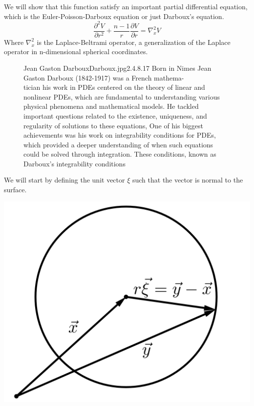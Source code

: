We will show that this function satisfy an important partial differential equation, which is the Euler-Poisson-Darboux equation or just Darboux's equation.
\begin{equation}
\frac{\partial^2 V}{\partial r^2} + \frac{n-1}{r}\frac{\partial V}{\partial r} = \nabla_{x}^{2} V
\end{equation} 
Where $\nabla_{x}^{2}$ is the Laplace-Beltrami operator, a generalization of the Laplace operator in n-dimensional spherical coordinates.
\par
\begin{figure}[b]
    \begin{minipage}[h]{\textwidth}
        \begin{enrichment}{Jean Gaston Darboux}{Darboux.jpg}{2.4}{.8}{.17}
            Born in Nimes Jean Gaston Darboux (1842-1917) was a French mathema-
            \\
            tician his work in PDEs centered on the theory of linear and nonlinear PDEs, 
            which are fundamental to understanding various physical phenomena and mathematical models. 
            He tackled important questions related to the existence, uniqueness, and regularity of solutions to these equations, 
            One of his biggest achievements was his work on integrability conditions for PDEs, which provided a deeper understanding of when such equations could be solved through integration. These conditions, known as Darboux's integrability conditions
        \end{enrichment}    
    \end{minipage}
\end{figure}
We will start by defining the unit vector $\xi$ such that the vector is normal to the surface.
\begin{center}
\includegraphics[scale=0.1]{xi.png}
\end{center}
